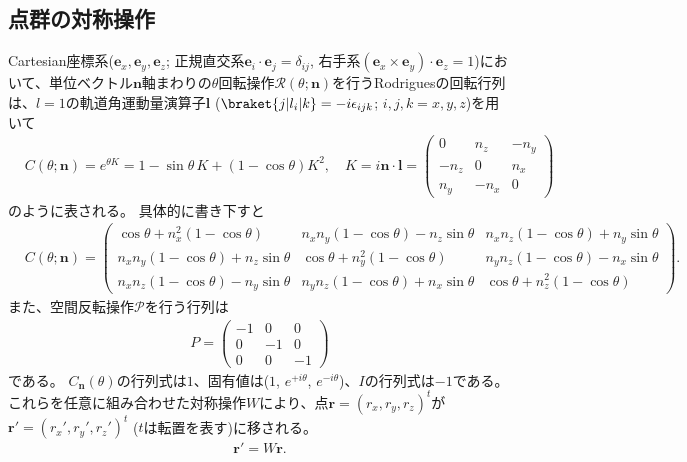 \documentclass[11pt]{easymemo}
\begin{document}
\subsection{点群の対称操作}

Cartesian座標系($\bm{e}_{x},\bm{e}_{y},\bm{e}_{z}$; 正規直交系$\bm{e}_{i}\cdot\bm{e}_{j}=\delta_{ij}$, 右手系$(\bm{e}_{x}\times\bm{e}_{y})\cdot\bm{e}_{z}=1$)において、単位ベクトル$\bm{n}$軸まわりの$\theta$回転操作$\mathcal{R}(\theta;\bm{n})$を行うRodriguesの回転行列は、$l=1$の軌道角運動量演算子$\bm{l}$ ($\braket{j|l_{i}|k}=-i\epsilon_{ijk}$; $i,j,k=x,y,z$)を用いて
\begin{align}
&
C(\theta;\bm{n})=
e^{\theta K}
=1-\sin\theta\,K+(1-\cos\theta)K^{2},
\quad
K=i\bm{n}\cdot\bm{l}
=\begin{pmatrix}
0 & n_{z} & -n_{y} \\ -n_{z} & 0 & n_{x} \\ n_{y} & -n_{x} & 0
\end{pmatrix}
\end{align}
のように表される。
具体的に書き下すと
\begin{align}
   &
  C(\theta;\bm{n})=
  \begin{pmatrix}
    \cos \theta+n_{x}^{2}(1-\cos \theta)         & n_{x} n_{y}(1-\cos \theta)-n_{z} \sin \theta & n_{x} n_{z}(1-\cos \theta)+n_{y} \sin \theta \\
    n_{x} n_{y}(1-\cos \theta)+n_{z} \sin \theta & \cos \theta+n_{y}^{2}(1-\cos \theta)         & n_{y} n_{z}(1-\cos \theta)-n_{x} \sin \theta \\
    n_{x} n_{z}(1-\cos \theta)-n_{y} \sin \theta & n_{y} n_{z}(1-\cos \theta)+n_{x} \sin \theta & \cos \theta+n_{z}^{2}(1-\cos \theta)
  \end{pmatrix}.
  \label{eq:rotmat}
\end{align}
また、空間反転操作$\mathcal{P}$を行う行列は
\begin{align}
  P=
  \begin{pmatrix}
    -1 & 0 & 0 \\ 0 & -1 & 0 \\ 0 & 0 & -1
  \end{pmatrix}
\end{align}
である。
$C_{\bm{n}}(\theta)$の行列式は$1$、固有値は($1$, $e^{+i\theta}$, $e^{-i\theta}$)、$I$の行列式は$-1$である。
これらを任意に組み合わせた対称操作$W$により、点$\bm{r}=(r_x,r_y,r_z)^{t}$が$\bm{r}'=(r_x',r_y',r_z')^{t}$ ($t$は転置を表す)に移される。
\begin{align}
\bm{r}'=W\bm{r}.
\end{align}
\end{document}
